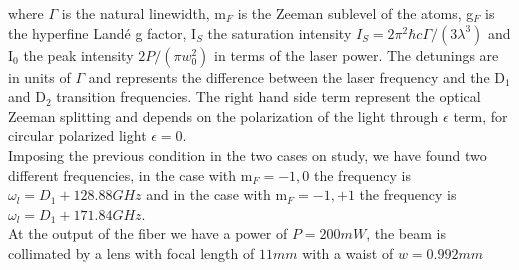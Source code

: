 \documentclass[../main.tex]{subfiles}
\begin{document}
where $\Gamma$ is the natural linewidth, m$_F$ is the Zeeman sublevel of the atoms, g$_F$ is the hyperfine Landé g factor, I$_S$ the saturation intensity $I_S = 2\pi^2 \hbar c \Gamma /(3\lambda^3)$ and I$_0$ the peak intensity $2P/(\pi\textit{w}^2_0)$ in terms of the laser power. The detunings are in units of $\Gamma$ and represents the difference between the laser frequency and the D$_1$ and D$_2$ transition frequencies. The right hand side term represent the optical Zeeman splitting and depends on the polarization of the light through $\epsilon$ term, for circular polarized light $\epsilon = 0$.\\
Imposing the previous condition in the two cases on study, we have found two different frequencies, in the case with m$_F = -1,0$ the frequency is $\omega_l = D_1 + 128.88 GHz$ and in the case with m$_F = -1,+1$ the frequency is $\omega_l = D_1 + 171.84 GHz$.\\

At the output of the fiber we have a power of $P = 200 mW$, the beam is collimated by a lens with focal length of $11 mm$ with a waist of $\textit{w} = 0.992 mm$
\end{document}
